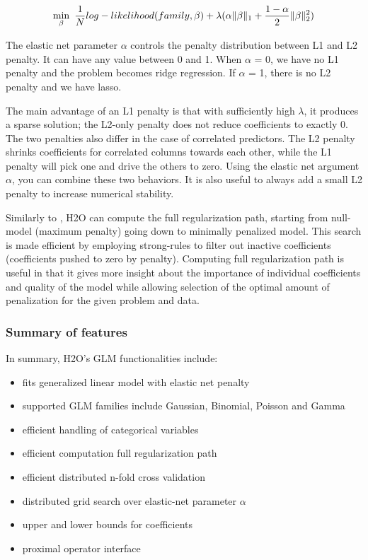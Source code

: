 \documentclass[11pt]{article}
\begin{document}
\[ \min\limits_{\beta}\ {{1\over{N}} log-likelihood(family,\beta)  + \lambda (\alpha \| \beta \|_1}  + {1- \alpha \over 2} \| \beta \|_2^2) \]

The elastic net parameter $\alpha$ controls the penalty distribution between L1 and L2 penalty. It can have any value between 0 and 1. When $\alpha$ = 0, we have no L1 penalty and the problem becomes ridge regression. If $\alpha$ = 1, there is no L2 penalty and we have lasso.

The main advantage of an L1 penalty is that with sufficiently high $\lambda$, it produces a sparse solution; the L2-only penalty does not reduce coefficients to exactly 0. The two penalties also differ in the case of correlated predictors. The L2 penalty shrinks coefficients for correlated columns towards each other, while the L1 penalty will pick one and drive the others to zero. Using the elastic net argument $\alpha$, you can combine these two behaviors. It is also useful to always add a small L2 penalty to increase numerical stability.

Similarly to \cite{glmnet}, H2O can compute the full regularization path, starting from null-model (maximum penalty) going down to minimally penalized model. This search is made efficient by employing strong-rules \cite{strong} to filter out inactive coefficients (coefficients pushed to zero by penalty). Computing full regularization path is useful in that it gives more insight about the importance of individual coefficients and quality of the model while allowing selection of the optimal amount of penalization for the given problem and data.


\subsubsection{Summary of features} 
In summary, H2O's GLM functionalities include:

\begin{itemize} 
\item fits generalized linear model with elastic net penalty
\item supported GLM families include Gaussian, Binomial, Poisson and Gamma
\item efficient handling of categorical variables
\item efficient computation full regularization path
\item efficient distributed n-fold cross validation
\item distributed grid search over elastic-net parameter $\alpha$
\item upper and lower bounds for coefficients
\item proximal operator interface
\end{itemize}
\end{document}
